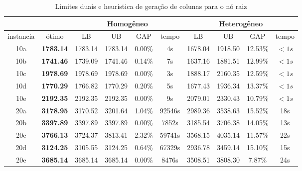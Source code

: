 \documentclass[12pt]{article}
\begin{document}
\begin{table}[!htb]
\centering
\footnotesize
\begin{tabular}{|c|c|c|c|c|c||c|c|c|c|}
\cline{3-10}
\multicolumn{2}{c}{} & \multicolumn{4}{|c||}{Homog\^eneo} & \multicolumn{4}{c|}{Heterog\^eneo} \\
\hline
instancia & \'otimo & LB & UB & GAP & tempo & LB & UB & GAP & tempo \\
\hline
10a & \textbf{1783.14} & 1783.14 & 1783.14 & 0.00\% & 4s & 1678.04 & 1918.50 & 12.53\% & $< 1s$\\
10b & \textbf{1741.46} & 1739.09 & 1741.46 & 0.14\% & 7s & 1637.16 & 1881.51 & 12.99\% & $< 1s$\\
10c & \textbf{1978.69} & 1978.69 & 1978.69 & 0.00\% & 3s & 1888.17 & 2160.35 & 12.59\% & $< 1s$\\
10d & \textbf{1770.29} & 1766.82 & 1770.29 & 0.20\% & 5s & 1677.43 & 1936.34 & 13.37\% & $< 1s$\\
10e & \textbf{2192.35} & 2192.35 & 2192.35 & 0.00\% & 9s & 2079.01 & 2330.43 & 10.79\% & $< 1s$\\
\hline \hline
20a & \textbf{3178.95} & 3170.52 & 3201.64 & 1.04\% & 92546s & 2989.36 & 3538.63 & 15.52\% & 18s \\
20b & \textbf{3397.89} & 3397.89 & 3397.89 & 0.00\% & 7852s & 3185.54 & 3706.38 & 14.05\% & 13s\\
20c & \textbf{3766.13} & 3724.37 & 3813.41 & 2.32\% & 59741s & 3568.15 & 4035.14 & 11.57\% & 22s\\
20d & \textbf{3124.25} & 3105.55 & 3124.25 & 0.64\% & 67329s & 2936.78 & 3459.14 & 15.10\% & 15s\\
20e & \textbf{3685.14} & 3685.14 & 3685.14 & 0.00\% & 8476s & 3508.51 & 3808.30 & 7.87\% & 24s\\
\hline
\end{tabular}
\caption{Limites duais e heur\'istica de gera\c{c}\~ao de colunas para o n\'o raiz}
\end{table}
\end{document}
